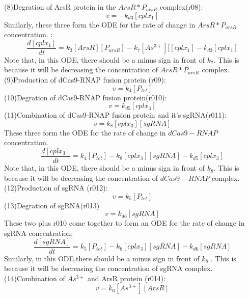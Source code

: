 (8)Degration of ArsR protein in the  $ArsR*P_{arsR}$ complex(r08):
\begin{displaymath}
v=-k_{d3}[cplx_1]
\end{displaymath}
Similarly, these three form the ODE for the rate of change in  $ArsR*P_{arsR}$ concentration.  :
\begin{equation}
\frac{d[cplx_1]}{dt}=k_3[ArsR][P_{arsR}]-k_7[As^{3+}][[cplx_1]-k_{d3}[cplx_1] \tag{3}
\end{equation}
Note that, in this ODE, there should be a minus sign in front of $k_7$. This is because it will be decreasing the concentration of  $ArsR*P_{arsR}$ complex.\\
(9)Production of dCas9-RNAP fusion protein (r09):
\begin{displaymath}
v=k_4[P_{tet}]
\end{displaymath}
(10)Degration of dCas9-RNAP fusion protein(r010):
\begin{displaymath}
v=k_{d5}[cplx_3]
\end{displaymath}
(11)Combination of dCas9-RNAP fusion protein and it's sgRNA(r011):
\begin{displaymath}
v=k_{8}[cplx_3][sgRNA]
\end{displaymath}
These three form the ODE for the rate of change in $dCas9-RNAP$ concentration.
\begin{equation}
\frac{d[cplx_3]}{dt}=k_4[P_{tet}]-k_{8}[cplx_3][sgRNA]-k_{d5}[cplx_3] \tag{4}
\end{equation}
Note that, in this ODE, there should be a minus sign in front of $k_8$. This is because it will be decreasing the concentration of  $dCas9-RNAP$ complex.\\
(12)Production of sgRNA (r012):
\begin{displaymath}
v=k_5[P_{tet}]
\end{displaymath}
(13)Degration of sgRNA(r013)
\begin{displaymath}
v=k_{d6}[sgRNA]
\end{displaymath}
These two plus r010 come together to form an ODE for the rate of change in sgRNA concentration:
\begin{equation}
\frac{d[sgRNA]}{dt}=k_5[P_{tet}]-k_{8}[cplx_3][sgRNA]-k_{d6}[sgRNA] \tag{5}
\end{equation}
Similarly, in this ODE,there should be a minus sign in front of $k_8$ . This is because it will be decreasing the concentration of sgRNA complex.\\
(14)Combination of $As^{3+}$ and ArsR protein (r014):
\begin{displaymath}
v=k_{6}[As^{3+}][ArsR]
\end{displaymath}
